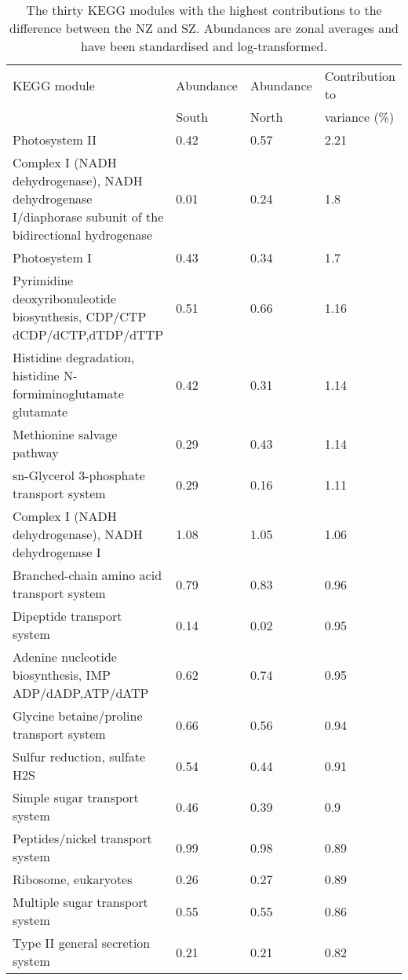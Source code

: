 \begin{sidewaystable}
\begin{center}
\caption[Contributions of KEGG modules to variance between the Noth and South zones]{The thirty \ac{KEGG} modules with the highest contributions to the difference between the \ac{NZ} and \ac{SZ}.
Abundances are zonal averages and have been standardised and log-transformed.}
\label{tab:modulessimper}
\smallskip
\begin{tabularx}{\textwidth}{Xlll}
\toprule
\ac{KEGG} module & Abundance & Abundance & Contribution to\\
& South & North & variance (\%)\\
\midrule
Photosystem II & 0.42 & 0.57 & 2.21\\
Complex I (NADH dehydrogenase), NADH dehydrogenase I/diaphorase subunit of the bidirectional hydrogenase & 0.01 & 0.24 & 1.8\\
Photosystem I & 0.43 & 0.34 & 1.7\\
Pyrimidine deoxyribonuleotide biosynthesis, CDP/CTP \textrightarrow{} dCDP/dCTP,dTDP/dTTP & 0.51 & 0.66 & 1.16\\
Histidine degradation, histidine \textrightarrow{} N-formiminoglutamate \textrightarrow{} glutamate & 0.42 & 0.31 & 1.14\\
Methionine salvage pathway & 0.29 & 0.43 & 1.14\\
sn-Glycerol 3-phosphate transport system & 0.29 & 0.16 & 1.11\\
Complex I (NADH dehydrogenase), NADH dehydrogenase I & 1.08 & 1.05 & 1.06\\
Branched-chain amino acid transport system & 0.79 & 0.83 & 0.96\\
Dipeptide transport system & 0.14 & 0.02 & 0.95\\
Adenine nucleotide biosynthesis, IMP \textrightarrow{} ADP/dADP,ATP/dATP & 0.62 & 0.74 & 0.95\\
Glycine betaine/proline transport system & 0.66 & 0.56 & 0.94\\
Sulfur reduction, sulfate \textrightarrow{} H2S & 0.54 & 0.44 & 0.91\\
Simple sugar transport system & 0.46 & 0.39 & 0.9\\
Peptides/nickel transport system & 0.99 & 0.98 & 0.89\\
Ribosome, eukaryotes & 0.26 & 0.27 & 0.89\\
Multiple sugar transport system & 0.55 & 0.55 & 0.86\\
Type II general secretion system & 0.21 & 0.21 & 0.82\\

\end{tabularx}
\end{center}
\end{sidewaystable}
